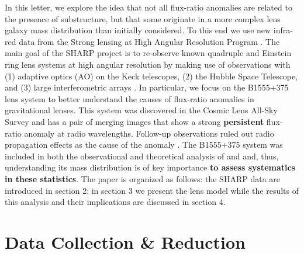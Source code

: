 \documentclass[useAMS,usenatbib]{mn2e}
\begin{document}
In this letter, we explore the idea that not all flux-ratio anomalies are
related to the presence of substructure, but that some originate in a
more complex lens galaxy mass distribution than initially
considered. To this end we use new infra-red data from the Strong
lensing at High Angular Resolution Program 
\citep[SHARP;][Fassnacht et al., in prep]{SHARP12, V12}.
The main goal of the SHARP project is to re-observe known
quadruple and Einstein ring lens systems at high angular
resolution by making use of observations with (1) adaptive optics (AO)
on the Keck telescopes, (2) the Hubble Space Telescope, and (3) large
interferometric arrays \citep{SHARP12,V12}. In particular, 
we focus on the B1555+375 lens system\citep{Marlow99} to better
understand the causes of flux-ratio anomalies in gravitational lenses.  This system was
discovered in the Cosmic Lens All-Sky Survey \citep{CLASS1,CLASS2} and
has a pair of merging images that show a strong \textbf{persistent} flux-ratio anomaly at
radio wavelengths.  Follow-up observations ruled out radio propagation
effects as the cause of the anomaly \citep{K03,KD04}.  The B1555+375
system was included in both the observational and theoretical analysis
of \citet{Dalal2002} and \citet{Xu14} and, thus, understanding its
mass distribution is of key importance \textbf{to assess systematics in these statistics}.  
The paper is organized as follows: the  SHARP data are
introduced in section 2; in section 3 we present the lens model while
the results of this analysis and their implications are discussed in
section 4.

\section{Data Collection \& Reduction}
\end{document}
